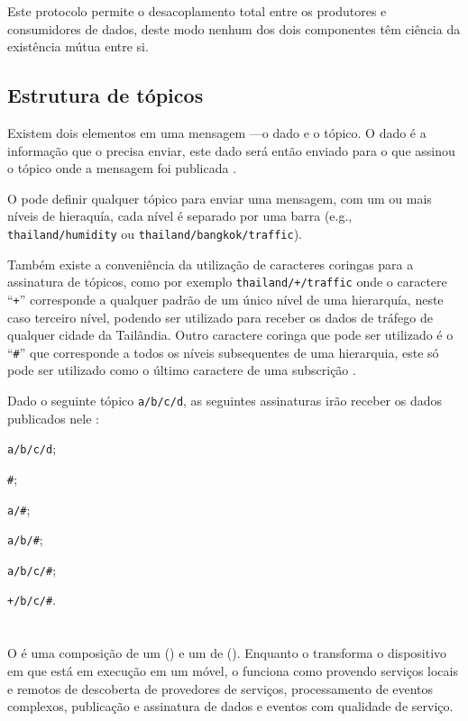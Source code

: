 Este protocolo permite o desacoplamento total entre os produtores e consumidores de dados, deste modo nenhum dos dois componentes têm ciência da existência mútua entre si.

\subsection{Estrutura de tópicos}

Existem dois elementos em uma mensagem \mqtt---o dado e o tópico. O dado é a informação que o \pub precisa enviar, este dado será então enviado para o \sub que assinou o tópico onde a mensagem foi publicada \cite{tantitharanukul:et-al:2017}.

O \pub pode definir qualquer tópico para enviar uma mensagem, com um ou mais níveis de hieraquía, cada nível é separado por uma barra (e.g., \texttt{thailand/humidity} ou \texttt{thailand/bangkok/traffic}).

Também existe a conveniência da utilização de caracteres coringas para a assinatura de tópicos, como por exemplo \texttt{thailand/+/traffic} onde o caractere ``\texttt{+}'' corresponde a qualquer padrão de um único nível de uma hierarquía, neste caso terceiro nível, podendo ser utilizado para receber os dados de tráfego de qualquer cidade da Tailândia. Outro caractere coringa que pode ser utilizado é o ``\texttt{\#}'' que corresponde a todos os níveis subsequentes de uma hierarquia, este só pode ser utilizado como o último caractere de uma subscrição \cite{hunkeler:truong:stanford-clark:2008}.

Dado o seguinte tópico \texttt{a/b/c/d}, as seguintes assinaturas irão receber os dados publicados nele \cite{light:mosquitto}:

\begin{alineas}
	\item \texttt{a/b/c/d};
	\item \texttt{\#};
	\item \texttt{a/\#};
	\item \texttt{a/b/\#};
	\item \texttt{a/b/c/\#};
	\item \texttt{+/b/c/\#}.
\end{alineas}
		
\section{\mhubcddl}

O \mhubcddl é uma composição de um \gateway (\mhub) e um \middleware de \iomt (\cddl). Enquanto o \mhub transforma o dispositivo \android em que está em execução em um \gateway \iot móvel, o \cddl funciona como \middleware provendo serviços locais e remotos de descoberta de provedores de serviços, processamento de eventos complexos, publicação e assinatura de dados e eventos com qualidade de serviço.


